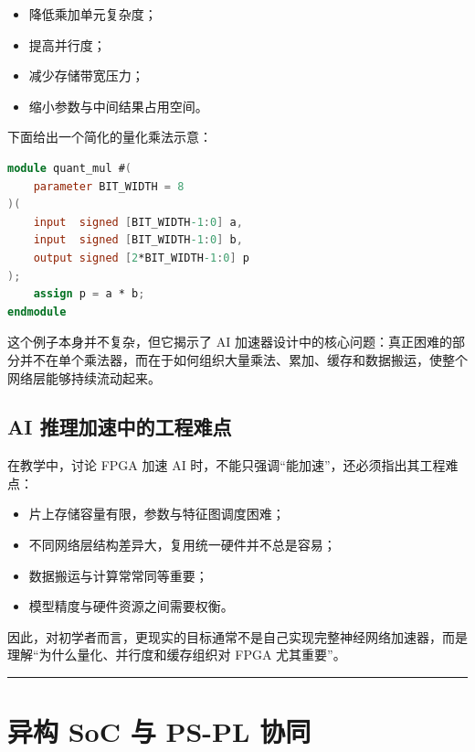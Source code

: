 \begin{itemize}
\tightlist
\item
  降低乘加单元复杂度；
\item
  提高并行度；
\item
  减少存储带宽压力；
\item
  缩小参数与中间结果占用空间。
\end{itemize}

下面给出一个简化的量化乘法示意：

\begin{lstlisting}[language=Verilog]
module quant_mul #(
    parameter BIT_WIDTH = 8
)(
    input  signed [BIT_WIDTH-1:0] a,
    input  signed [BIT_WIDTH-1:0] b,
    output signed [2*BIT_WIDTH-1:0] p
);
    assign p = a * b;
endmodule
\end{lstlisting}

这个例子本身并不复杂，但它揭示了 AI
加速器设计中的核心问题：真正困难的部分并不在单个乘法器，而在于如何组织大量乘法、累加、缓存和数据搬运，使整个网络层能够持续流动起来。

\subsection{AI
推理加速中的工程难点}\label{ai-ux63a8ux7406ux52a0ux901fux4e2dux7684ux5de5ux7a0bux96beux70b9}

在教学中，讨论 FPGA 加速 AI
时，不能只强调``能加速''，还必须指出其工程难点：

\begin{itemize}
\tightlist
\item
  片上存储容量有限，参数与特征图调度困难；
\item
  不同网络层结构差异大，复用统一硬件并不总是容易；
\item
  数据搬运与计算常常同等重要；
\item
  模型精度与硬件资源之间需要权衡。
\end{itemize}

因此，对初学者而言，更现实的目标通常不是自己实现完整神经网络加速器，而是理解``为什么量化、并行度和缓存组织对
FPGA 尤其重要''。

\begin{center}\rule{0.5\linewidth}{0.5pt}\end{center}

\section{异构 SoC 与 PS-PL
协同}\label{ux5f02ux6784-soc-ux4e0e-ps-pl-ux534fux540c}

